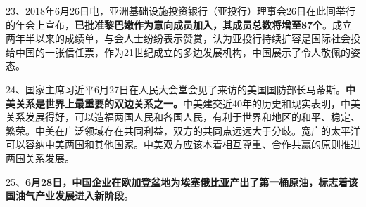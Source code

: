 23、2018年6月26日电，亚洲基础设施投资银行（亚投行）理事会26日在此间举行的年会上宣布，{\textbf{已批准黎巴嫩作为意向成员加入，其成员总数将增至87个}}。成立两年半以来的成绩单，与会人士纷纷表示赞赏，认为亚投行持续扩容是国际社会投给中国的一张信任票，作为21世纪成立的多边发展机构，中国展示了令人敬佩的姿态。

24、国家主席习近平6月27日在人民大会堂会见了来访的美国国防部长马蒂斯。{\textbf{中美关系是世界上最重要的双边关系之一。}}中美建交近40年的历史和现实表明，中美关系发展得好，可以造福两国人民和各国人民，有利于世界和地区的和平、稳定、繁荣。中美在广泛领域存在共同利益，双方的共同点远远大于分歧。宽广的太平洋可以容纳中美两国和其他国家。中美双方应该本着相互尊重、合作共赢的原则推进两国关系发展。

25、{\textbf{6月28日，中国企业在欧加登盆地为埃塞俄比亚产出了第一桶原油，标志着该国油气产业发展进入新阶段}}。
